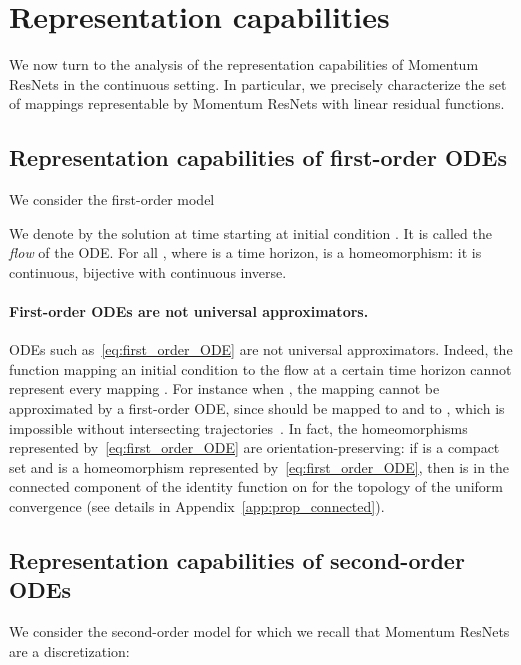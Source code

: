 \documentclass{article}
\begin{document}
\section{Representation capabilities}\label{section:representation_capabilities}
We now turn to the analysis of the representation capabilities of Momentum ResNets in the continuous setting. In particular, we precisely characterize the set of mappings representable by Momentum ResNets with linear residual functions. 
\subsection{Representation capabilities of first-order ODEs}\label{section:representation_capabilitie}
We consider the first-order model 


We denote by  the solution at time  starting at initial condition . It is called the \textit{flow} of the ODE. For all , where  is a time horizon,  is a homeomorphism: it is continuous, bijective with continuous inverse. 

\paragraph{First-order ODEs are not universal approximators.}

ODEs such as~\eqref{eq:first_order_ODE} are not universal approximators. Indeed, the function mapping an initial condition to the flow at a certain time horizon  cannot represent every mapping . For instance when , the mapping  cannot be approximated by a first-order ODE, since  should be mapped to  and  to , which is impossible without intersecting trajectories~\citep{dupont2019augmented}. In fact, the homeomorphisms represented by~\eqref{eq:first_order_ODE} are orientation-preserving: if  is a compact set and  is a homeomorphism represented by~\eqref{eq:first_order_ODE}, then  is in the connected component of the identity function on  for the topology of the uniform convergence (see details in Appendix~\ref{app:prop_connected}). 

\subsection{Representation capabilities of second-order ODEs}
We consider the second-order model for which we recall that Momentum ResNets are a discretization: 
\end{document}
